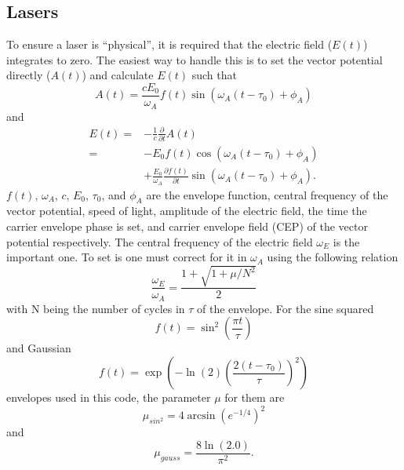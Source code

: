\documentclass{article}
\begin{document}
\subsection{Lasers} %
\label{sub:lasers}

To ensure a laser is ``physical'', it is required that the electric field ($E(t)$) integrates to zero. The easiest way to handle this is to set the vector potential directly ($A(t)$) and calculate $E(t)$ such that
\begin{equation}
A(t) = \frac{cE_0}{\omega_A} f(t) \sin(\omega_A(t-\tau_0)+\phi_A)
\label{eq:afield}
\end{equation}
and
\begin{equation}
\begin{split}
\label{eq:efield}
E(t) =& -\frac{1}{c}\frac{\partial}{\partial t}A(t)
\\
=&-E_0f(t) \cos(\omega_A (t-\tau_0) +\phi_A)
\\
&
+\frac{E_0}{\omega_A}\frac{\partial f(t)}{\partial t}
\sin(\omega_A (t-\tau_0) +\phi_A).
\end{split}
\end{equation}
$f(t)$, $\omega_A$,
$c$, $E_0$, $\tau_0$, and $\phi_A$ are the envelope function, central frequency of the vector potential, speed of light, amplitude of the electric field, the time the carrier envelope phase is set, and carrier envelope field (CEP) of the vector potential respectively. The central frequency of the electric field $\omega_E$ is the important one. To set is one must correct for it in $\omega_A$ using the following relation
\begin{equation}
\label{eq:fshift}
\frac{\omega_E}{\omega_A} = \frac{1+\sqrt{1+\mu/N^{2}}}{2}
\end{equation}
with N being the number of cycles in $\tau$ of the envelope. For the sine squared
\begin{equation}
f(t) = \sin^2\left(\frac{\pi t}{\tau}\right)
\label{eq:sin2}
\end{equation}
and Gaussian
\begin{equation}
f(t) = \exp\left(-\ln(2)\left(\frac{2(t-\tau_0)}{\tau}\right)^2\right)
\label{eq:gauss}
\end{equation}
envelopes used in this code, the parameter $\mu$ for them are
\begin{equation}
  \mu_{sin^2} = 4  \arcsin(e^{-1 / 4})^2
\end{equation}
and
\begin{equation}
  \mu_{gauss} = \frac{8 \ln(2.0) }{ \pi^2}.
\end{equation}
\end{document}
